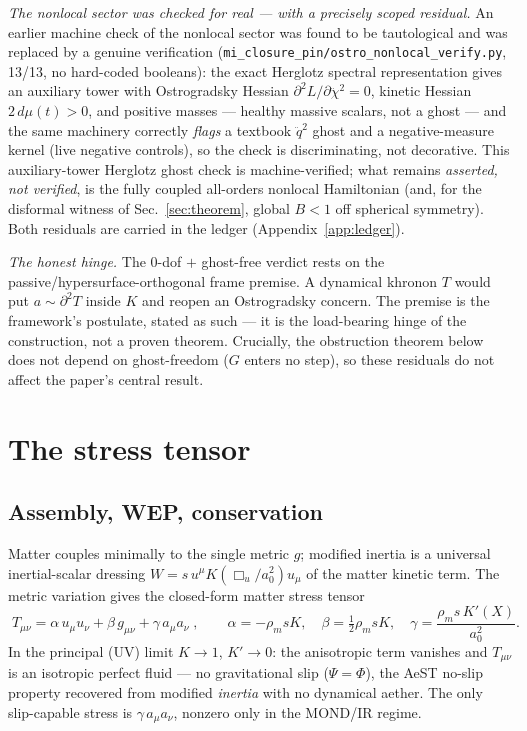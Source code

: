 \documentclass[11pt]{article}
\newcommand{\Boxu}{\Box_u}
\begin{document}
\emph{The nonlocal sector was checked for real --- with a precisely scoped residual.} An earlier machine check of the nonlocal sector was found to be tautological and was replaced by a genuine verification (\texttt{mi\_closure\_pin/ostro\_nonlocal\_verify.py}, 13/13, no hard-coded booleans): the exact Herglotz spectral representation gives an auxiliary tower with Ostrogradsky Hessian $\partial^2L/\partial\ddot\chi^2=0$, kinetic Hessian $2\,d\mu(t)>0$, and positive masses --- healthy massive scalars, not a ghost --- and the same machinery correctly \emph{flags} a textbook $\ddot q^2$ ghost and a negative-measure kernel (live negative controls), so the check is discriminating, not decorative. This auxiliary-tower Herglotz ghost check is machine-verified; what remains \emph{asserted, not verified}, is the fully coupled all-orders nonlocal Hamiltonian (and, for the disformal witness of Sec.~\ref{sec:theorem}, global $B<1$ off spherical symmetry). Both residuals are carried in the ledger (Appendix~\ref{app:ledger}).

\emph{The honest hinge.} The 0-dof $+$ ghost-free verdict rests on the passive/hypersurface-orthogonal frame premise. A dynamical khronon $T$ would put $a\sim\partial^2T$ inside $K$ and reopen an Ostrogradsky concern. The premise is the framework's postulate, stated as such --- it is the load-bearing hinge of the construction, not a proven theorem. Crucially, the obstruction theorem below does not depend on ghost-freedom ($G$ enters no step), so these residuals do not affect the paper's central result.

\section{The stress tensor}\label{sec:tmunu}

\subsection{Assembly, WEP, conservation}

Matter couples minimally to the single metric $g$; modified inertia is a universal inertial-scalar dressing $W=s\,u^\mu K(\Boxu/a_0^2)u_\mu$ of the matter kinetic term. The metric variation gives the closed-form matter stress tensor
\begin{equation}
\boxed{\;T_{\mu\nu}=\alpha\,u_\mu u_\nu+\beta\,g_{\mu\nu}+\gamma\,a_\mu a_\nu\;},\qquad
\alpha=-\rho_m sK,\quad \beta=\tfrac12\rho_m sK,\quad \gamma=\frac{\rho_m s\,K'(X)}{a_0^2}.
\end{equation}
In the principal (UV) limit $K\to1$, $K'\to0$: the anisotropic term vanishes and $T_{\mu\nu}$ is an isotropic perfect fluid --- no gravitational slip ($\Psi=\Phi$), the AeST no-slip property recovered from modified \emph{inertia} with no dynamical aether. The only slip-capable stress is $\gamma\,a_\mu a_\nu$, nonzero only in the MOND/IR regime.
\end{document}
